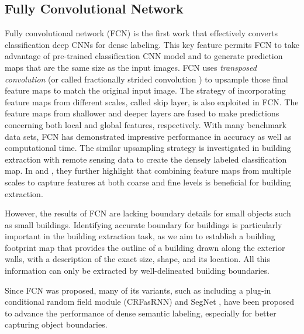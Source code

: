 \documentclass[journal]{IEEEtran}
\begin{document}
\subsection{Fully Convolutional Network}
Fully convolutional network (FCN) \cite{ShelhamerLongDarrell2017} is the first work that effectively converts classification deep CNNs for dense labeling. This key feature permits FCN to take advantage of pre-trained classification CNN model and to generate prediction maps that are the same size as the input images. FCN uses \textit{transposed convolution} (or called fractionally strided convolution \cite{RadfordMetzChintala2015}) to upsample those final feature maps to match the original input image. The strategy of incorporating feature maps from different scales, called skip layer, is also exploited in FCN. The feature maps from shallower and deeper layers are fused to make predictions concerning both local and global features, respectively. With many benchmark data sets, FCN has demonstrated impressive performance in accuracy as well as computational time. The similar upsampling strategy is investigated in building extraction with remote sensing data \cite{Yuan2018,VolpiTuia2017,Maggiori2016} to create the densely labeled classification map. In \cite{Yuan2018} and \cite{Maggiori2016}, they further highlight that combining feature maps from multiple scales to capture features at both coarse and fine levels is beneficial for building extraction. 

However, the results of FCN are lacking boundary details for small objects such as small buildings. Identifying accurate boundary for buildings is particularly important in the building extraction task, as we aim to establish a building footprint map that provides the outline of a building drawn along the exterior walls, with a description of the exact size, shape, and its location. All this information can only be extracted by well-delineated building boundaries.

Since FCN was proposed, many of its variants, such as including a plug-in conditional random field module \cite{ZhengJayasumanaRomera-ParedesEtAl2015} (CRFasRNN) and SegNet \cite{BadrinarayananKendallCipolla2017},  have been proposed to advance the performance of dense semantic labeling, especially for better capturing object boundaries. 
\end{document}
